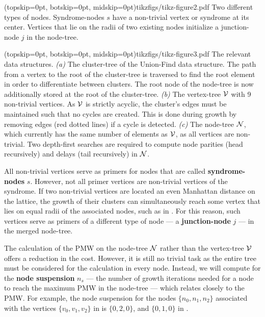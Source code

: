 \Figure[htb](topskip=0pt, botskip=0pt, midskip=0pt){tikzfigs/tikz-figure2.pdf}{
    Two different types of nodes. Syndrome-nodes $s$ have a non-trivial vertex or syndrome at its center. Vertices that lie on the radii of two existing nodes initialize a junction-node $j$ in the node-tree.\label{fig2}}

\Figure[hbt](topskip=0pt, botskip=0pt, midskip=0pt){tikzfigs/tikz-figure3.pdf}{
    The relevant data structures. \emph{(a)} The cluster-tree of the Union-Find data structure. The path from a vertex to the root of the cluster-tree is traversed to find the root element in order to differentiate between clusters. The root node of the node-tree is now additionally stored at the root of the cluster-tree. \emph{(b)} The vertex-tree $\mathcal{V}$ with 9 non-trivial vertices. As $\mathcal{V}$ is strictly acyclic, the cluster's edges must be maintained such that no cycles are created. This is done during growth by removing edges (red dotted lines) if a cycle is detected. \emph{(c)} The node-tree $\mathcal{N}$, which currently has the same number of elements as $\mathcal{V}$, as all vertices are non-trivial. Two depth-first searches are required to compute node parities (head recursively) and delays (tail recursively) in $\mathcal{N}$.\label{fig3}}

All non-trivial vertices serve as primers for nodes that are called \textbf{syndrome-nodes} $s$. However, not all primer vertices are non-trivial vertices of the syndrome. If two non-trivial vertices are located an even Manhattan distance on the lattice, the growth of their clusters can simultaneously reach some vertex that lies on equal radii of the associated nodes, such as in . For this reason, such vertices serve as primers of a different type of node --- a \textbf{junction-node} $j$ --- in the merged node-tree. 

The calculation of the PMW on the node-tree $\mathcal{N}$ rather than the vertex-tree $\mathcal{V}$ offers a reduction in the cost. However, it is still no trivial task as the entire tree must be considered for the calculation in every node. Instead, we will compute for the \textbf{node suspension} $n_s$ --- the number of growth iterations needed for a node to reach the maximum PMW in the node-tree --- which relates closely to the PMW. For example, the node suspension for the nodes $\{n_0, n_1, n_2\}$ associated with the vertices $\{v_0, v_1, v_2\}$ in  is $\{0, 2, 0\}$, and $\{0, 1, 0\}$ in .

